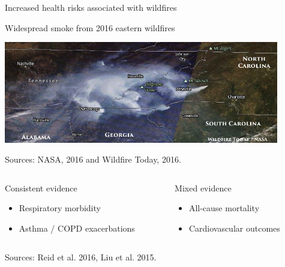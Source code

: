 \documentclass[ignorenonframetext,]{beamer}
\begin{document}
\begin{frame}{Increased health risks associated with wildfires}

\vspace{-0.6cm}

\small

\begin{center}
Widespread smoke from 2016 eastern wildfires
\end{center}

\vspace{-0.9cm}

\begin{center}\includegraphics[width=0.9\textwidth]{wildfire_smoke} \end{center}

\vspace{-0.7cm} \scriptsize Sources: NASA, 2016 and Wildfire Today,
2016.

\begin{columns}

\begin{column}{0.5\textwidth}
\begin{block}{\small Consistent evidence}
\footnotesize
\begin{itemize}
  \item Respiratory morbidity
  \item Asthma / COPD exacerbations
\end{itemize}
\end{block}
\end{column}

\begin{column}{0.5\textwidth}
\begin{block}{\small Mixed evidence}
\footnotesize
\begin{itemize}
  \item All-cause mortality
  \item Cardiovascular outcomes
\end{itemize}
\end{block}
\end{column}
\end{columns}

\vspace{-0.4cm}

\begin{center}
\footnotesize Sources: Reid et al. 2016, Liu et al. 2015.
\end{center}

\end{frame}
\end{document}
